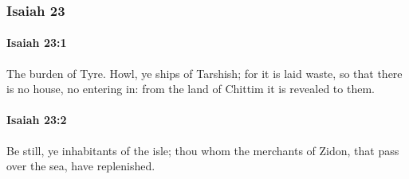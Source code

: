 	\subsubsection{Isaiah 23} %
		\label{ISAIAH-23}

		\paragraph{Isaiah 23:1} %
			\label{ISAIAH-23-1}

			The burden of Tyre. Howl, ye ships of Tarshish; for it is laid waste, so that there is no house, no entering in: from the land of Chittim it is revealed to them.


		\paragraph{Isaiah 23:2} %
			\label{ISAIAH-23-2}

			Be still, ye inhabitants of the isle; thou whom the merchants of Zidon, that pass over the sea, have replenished.


